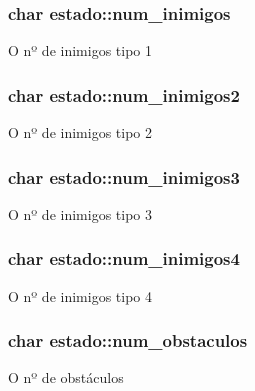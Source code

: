 \subsubsection[{\texorpdfstring{num\+\_\+inimigos}{num_inimigos}}]{\setlength{\rightskip}{0pt plus 5cm}char estado\+::num\+\_\+inimigos}\hypertarget{structestado_a6fbc4a80c4f371036f264ecfe27e5f9e}{}\label{structestado_a6fbc4a80c4f371036f264ecfe27e5f9e}
O nº de inimigos tipo 1 
\subsubsection[{\texorpdfstring{num\+\_\+inimigos2}{num_inimigos2}}]{\setlength{\rightskip}{0pt plus 5cm}char estado\+::num\+\_\+inimigos2}\hypertarget{structestado_aee72c74ed46223084d992af2771c2dd0}{}\label{structestado_aee72c74ed46223084d992af2771c2dd0}
O nº de inimigos tipo 2 
\subsubsection[{\texorpdfstring{num\+\_\+inimigos3}{num_inimigos3}}]{\setlength{\rightskip}{0pt plus 5cm}char estado\+::num\+\_\+inimigos3}\hypertarget{structestado_a9313b0aa4b93988070f08a615c18bd10}{}\label{structestado_a9313b0aa4b93988070f08a615c18bd10}
O nº de inimigos tipo 3 
\subsubsection[{\texorpdfstring{num\+\_\+inimigos4}{num_inimigos4}}]{\setlength{\rightskip}{0pt plus 5cm}char estado\+::num\+\_\+inimigos4}\hypertarget{structestado_a68897a14128dea552485db99a06c5c0a}{}\label{structestado_a68897a14128dea552485db99a06c5c0a}
O nº de inimigos tipo 4 
\subsubsection[{\texorpdfstring{num\+\_\+obstaculos}{num_obstaculos}}]{\setlength{\rightskip}{0pt plus 5cm}char estado\+::num\+\_\+obstaculos}\hypertarget{structestado_ac1a8a541e2301189833c6f713c416063}{}\label{structestado_ac1a8a541e2301189833c6f713c416063}
O nº de obstáculos 
